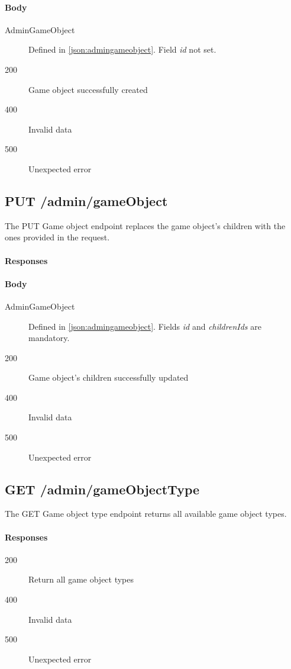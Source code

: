 			\paragraph*{Body}
				\begin{description}
					\item[AdminGameObject] Defined in \ref{json:admingameobject}. Field \textit{id} not set.
				\end{description}
			\begin{description}		
				\item[200] Game object successfully created
				\item[400] Invalid data
				\item[500] Unexpected error
			\end{description}
			
	\subsection{PUT /admin/gameObject}
	The PUT Game object endpoint replaces the game object's children with the ones provided in the request.
		\paragraph*{Responses}
			\paragraph*{Body}
				\begin{description}
					\item[AdminGameObject] Defined in \ref{json:admingameobject}. Fields \textit{id} and \textit{childrenIds} are mandatory.
				\end{description}
			\begin{description}		
				\item[200] Game object's children successfully updated
				\item[400] Invalid data
				\item[500] Unexpected error
			\end{description}
			
	\subsection{GET /admin/gameObjectType}
	The GET Game object type endpoint returns all available game object types.
		\paragraph*{Responses}
			\begin{description}		
				\item[200] Return all game object types
				\item[400] Invalid data
				\item[500] Unexpected error
			\end{description}
			
